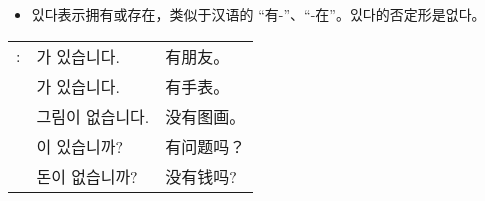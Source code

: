 \begin{grammar}
    \begin{grammarsect}[\kr 있다]
        \begin{itemize}
            \item {\kr 있다}表示拥有或存在，类似于汉语的 “有-”、“-在”。{\kr 있다}的否定形是{\kr 없다}。
        \end{itemize}
        \begin{tabular}{lll}
            \kr \ruby{例}{예}: &\kr \ruby{親舊}{친구}가 있습니다. &有朋友。\\
            &\kr \ruby{時計}{시계}가 있습니다. &有手表。\\
            &\kr 그림이 없습니다. &没有图画。\\
            &\kr \ruby{質問}{질문}이 있습니까? &有问题吗？\\
            &\kr 돈이 없습니까? &没有钱吗?
        \end{tabular}\\
    \end{grammarsect}
\end{grammar}
